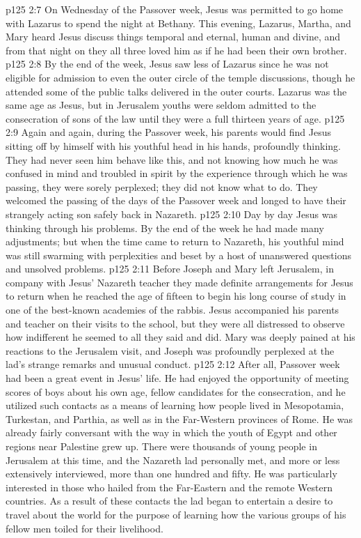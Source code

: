 \vs p125 2:7 On Wednesday of the Passover week, Jesus was permitted to go home with Lazarus to spend the night at Bethany. This evening, Lazarus, Martha, and Mary heard Jesus discuss things temporal and eternal, human and divine, and from that night on they all three loved him as if he had been their own brother.
\vs p125 2:8 By the end of the week, Jesus saw less of Lazarus since he was not eligible for admission to even the outer circle of the temple discussions, though he attended some of the public talks delivered in the outer courts. Lazarus was the same age as Jesus, but in Jerusalem youths were seldom admitted to the consecration of sons of the law until they were a full thirteen years of age.
\vs p125 2:9 Again and again, during the Passover week, his parents would find Jesus sitting off by himself with his youthful head in his hands, profoundly thinking. They had never seen him behave like this, and not knowing how much he was confused in mind and troubled in spirit by the experience through which he was passing, they were sorely perplexed; they did not know what to do. They welcomed the passing of the days of the Passover week and longed to have their strangely acting son safely back in Nazareth.
\vs p125 2:10 Day by day Jesus was thinking through his problems. By the end of the week he had made many adjustments; but when the time came to return to Nazareth, his youthful mind was still swarming with perplexities and beset by a host of unanswered questions and unsolved problems.
\vs p125 2:11 Before Joseph and Mary left Jerusalem, in company with Jesus’ Nazareth teacher they made definite arrangements for Jesus to return when he reached the age of fifteen to begin his long course of study in one of the best\hyp{}known academies of the rabbis. Jesus accompanied his parents and teacher on their visits to the school, but they were all distressed to observe how indifferent he seemed to all they said and did. Mary was deeply pained at his reactions to the Jerusalem visit, and Joseph was profoundly perplexed at the lad’s strange remarks and unusual conduct.
\vs p125 2:12 After all, Passover week had been a great event in Jesus’ life. He had enjoyed the opportunity of meeting scores of boys about his own age, fellow candidates for the consecration, and he utilized such contacts as a means of learning how people lived in Mesopotamia, Turkestan, and Parthia, as well as in the Far\hyp{}Western provinces of Rome. He was already fairly conversant with the way in which the youth of Egypt and other regions near Palestine grew up. There were thousands of young people in Jerusalem at this time, and the Nazareth lad personally met, and more or less extensively interviewed, more than one hundred and fifty. He was particularly interested in those who hailed from the Far\hyp{}Eastern and the remote Western countries. As a result of these contacts the lad began to entertain a desire to travel about the world for the purpose of learning how the various groups of his fellow men toiled for their livelihood.\plusone
